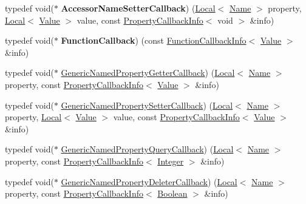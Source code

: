 \begin{DoxyCompactItemize}
\item 
\mbox{\label{namespacev8_a476b359c9fc5ad874bcc2a1a21075556}} 
typedef void($\ast$ {\bfseries Accessor\+Name\+Setter\+Callback}) (\mbox{\hyperlink{classv8_1_1Local}{Local}}$<$ \mbox{\hyperlink{classv8_1_1Name}{Name}} $>$ property, \mbox{\hyperlink{classv8_1_1Local}{Local}}$<$ \mbox{\hyperlink{classv8_1_1Value}{Value}} $>$ value, const \mbox{\hyperlink{classv8_1_1PropertyCallbackInfo}{Property\+Callback\+Info}}$<$ void $>$ \&info)
\item 
\mbox{\label{namespacev8_a9eb0624666bb117aea1fb9c9424dcc1b}} 
typedef void($\ast$ {\bfseries Function\+Callback}) (const \mbox{\hyperlink{classv8_1_1FunctionCallbackInfo}{Function\+Callback\+Info}}$<$ \mbox{\hyperlink{classv8_1_1Value}{Value}} $>$ \&info)
\item 
typedef void($\ast$ \mbox{\hyperlink{namespacev8_a24b1801fa53a7c5a71366d8044927563}{Generic\+Named\+Property\+Getter\+Callback}}) (\mbox{\hyperlink{classv8_1_1Local}{Local}}$<$ \mbox{\hyperlink{classv8_1_1Name}{Name}} $>$ property, const \mbox{\hyperlink{classv8_1_1PropertyCallbackInfo}{Property\+Callback\+Info}}$<$ \mbox{\hyperlink{classv8_1_1Value}{Value}} $>$ \&info)
\item 
typedef void($\ast$ \mbox{\hyperlink{namespacev8_af74716c6e95a269c6cd4314662fd0a7e}{Generic\+Named\+Property\+Setter\+Callback}}) (\mbox{\hyperlink{classv8_1_1Local}{Local}}$<$ \mbox{\hyperlink{classv8_1_1Name}{Name}} $>$ property, \mbox{\hyperlink{classv8_1_1Local}{Local}}$<$ \mbox{\hyperlink{classv8_1_1Value}{Value}} $>$ value, const \mbox{\hyperlink{classv8_1_1PropertyCallbackInfo}{Property\+Callback\+Info}}$<$ \mbox{\hyperlink{classv8_1_1Value}{Value}} $>$ \&info)
\item 
typedef void($\ast$ \mbox{\hyperlink{namespacev8_add9f7ab11e4a9a2b9ad2c4536b0e1a64}{Generic\+Named\+Property\+Query\+Callback}}) (\mbox{\hyperlink{classv8_1_1Local}{Local}}$<$ \mbox{\hyperlink{classv8_1_1Name}{Name}} $>$ property, const \mbox{\hyperlink{classv8_1_1PropertyCallbackInfo}{Property\+Callback\+Info}}$<$ \mbox{\hyperlink{classv8_1_1Integer}{Integer}} $>$ \&info)
\item 
typedef void($\ast$ \mbox{\hyperlink{namespacev8_ad2aecc0406ea4bc02d5a4f84a433b273}{Generic\+Named\+Property\+Deleter\+Callback}}) (\mbox{\hyperlink{classv8_1_1Local}{Local}}$<$ \mbox{\hyperlink{classv8_1_1Name}{Name}} $>$ property, const \mbox{\hyperlink{classv8_1_1PropertyCallbackInfo}{Property\+Callback\+Info}}$<$ \mbox{\hyperlink{classv8_1_1Boolean}{Boolean}} $>$ \&info)

\end{DoxyCompactItemize}
